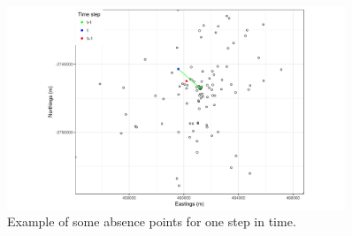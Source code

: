 \documentclass[12pt,a4paper, twoside, english]{article}
\begin{document}



\begin{figure}[H]
  \centering
  \includegraphics[width=0.9\textwidth]{figures/SSF_Absence_Test.png}
  \caption[SSF absence point example]{Example of some absence points for one step in time.}
  \label{fig:ssf_absence_test}
\end{figure}
\end{document}
